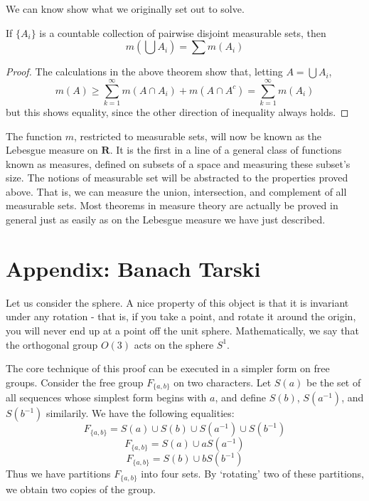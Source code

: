 We can know show what we originally set out to solve.

\begin{theorem}
    If $\{ A_i \}$ is a countable collection of pairwise disjoint measurable sets, then
    \[ m(\bigcup A_i) = \sum m(A_i) \]
\end{theorem}
\begin{proof}
    The calculations in the above theorem show that, letting $A = \bigcup A_i$,
    \[ m(A) \geq \sum_{k = 1}^\infty m(A \cap A_i) + m(A \cap A^c) = \sum_{k = 1}^\infty m(A_i) \]
    but this shows equality, since the other direction of inequality always holds.
\end{proof}

The function $m$, restricted to measurable sets, will now be known as the Lebesgue measure on $\mathbf{R}$. It is the first in a line of a general class of functions known as measures, defined on subsets of a space and measuring these subset's size. The notions of measurable set will be abstracted to the properties proved above. That is, we can measure the union, intersection, and complement of all measurable sets. Most theorems in measure theory are actually be proved in general just as easily as on the Lebesgue measure we have just described.





\section{Appendix: Banach Tarski}

Let us consider the sphere. A nice property of this object is that it is invariant under any rotation - that is, if you take a point, and rotate it around the origin, you will never end up at a point off the unit sphere. Mathematically, we say that the orthogonal group $O(3)$ acts on the sphere $S^1$.

The core technique of this proof can be executed in a simpler form on free groups. Consider the free group $F_{\{a,b\}}$ on two characters. Let $S(a)$ be the set of all sequences whose simplest form begins with $a$, and define $S(b)$, $S(a^{-1})$, and $S(b^{-1})$ similarily. We have the following equalities:
%
\[ F_{\{a,b\}} = S(a) \cup S(b) \cup S(a^{-1}) \cup S(b^{-1}) \]
\[ F_{\{a,b\}} = S(a) \cup aS(a^{-1}) \]
\[ F_{\{a,b\}} = S(b) \cup bS(b^{-1}) \]
%
Thus we have partitions $F_{\{a,b\}}$ into four sets. By `rotating' two of these partitions, we obtain two copies of the group.

